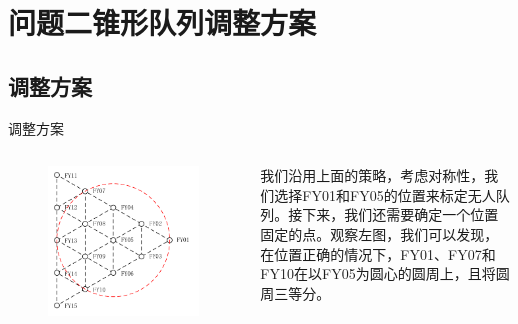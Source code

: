\documentclass[aspectratio=169]{beamer}
\begin{document}

\section[问题2]{问题二锥形队列调整方案}

\subsection{调整方案}

\begin{frame}{调整方案}
    \begin{columns}
        \begin{figure}[!ht]
            \centering
            \includegraphics[width=\textwidth]{图片/问题2示意图.pdf}
        \end{figure}

        我们沿用上面的策略，考虑对称性，我们选择FY01和FY05的位置来标定无人队列。接下来，我们还需要确定一个位置固定的点。观察左图，我们可以发现，在位置正确的情况下，FY01、FY07和FY10在以FY05为圆心的圆周上，且将圆周三等分。
    \end{columns}
\end{frame}
\end{document}
